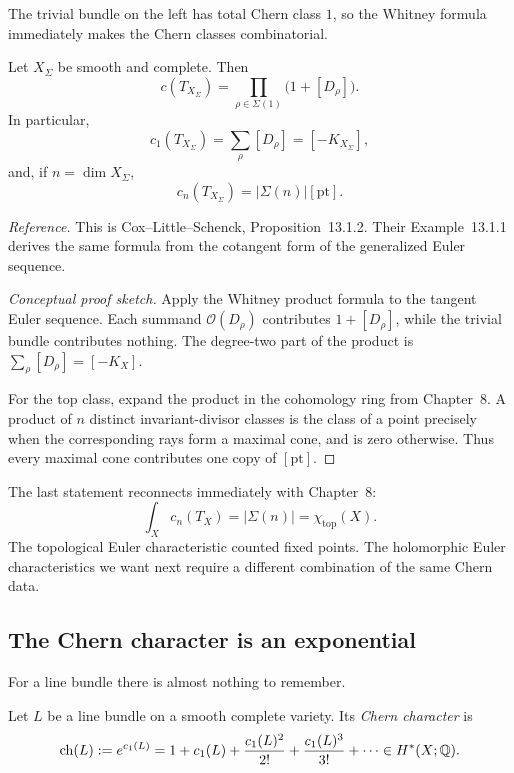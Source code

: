 The trivial bundle on the left has total Chern class \(1\), so the
Whitney formula immediately makes the Chern classes combinatorial.

\begin{proposition}
\label{prop:toric-total-chern-class}
Let \(X_\Sigma\) be smooth and complete. Then
\[
\boxed{
c(T_{X_\Sigma})
=
\prod_{\rho\in\Sigma(1)}\bigl(1+[D_\rho]\bigr).
}
\]
In particular,
\[
c_1(T_{X_\Sigma})
=
\sum_\rho[D_\rho]
=
[-K_{X_\Sigma}],
\]
and, if \(n=\dim X_\Sigma\),
\[
c_n(T_{X_\Sigma})
=
|\Sigma(n)|[\mathrm{pt}].
\]
\end{proposition}

\noindent
\textit{Reference.}
This is Cox--Little--Schenck, Proposition~13.1.2. Their
Example~13.1.1 derives the same formula from the cotangent form of the
generalized Euler sequence.

\begin{proof}[Conceptual proof sketch]
Apply the Whitney product formula to the tangent Euler sequence. Each
summand \(\mathcal O(D_\rho)\) contributes \(1+[D_\rho]\), while the
trivial bundle contributes nothing. The degree-two part of the product
is \(\sum_\rho[D_\rho]=[-K_X]\).

For the top class, expand the product in the cohomology ring from
Chapter~8. A product of \(n\) distinct invariant-divisor classes is the
class of a point precisely when the corresponding rays form a maximal
cone, and is zero otherwise. Thus every maximal cone contributes one
copy of \([\mathrm{pt}]\).
\end{proof}

The last statement reconnects immediately with Chapter~8:
\[
\int_X c_n(T_X)
=
|\Sigma(n)|
=
\chi_{\mathrm{top}}(X).
\]
The topological Euler characteristic counted fixed points. The
holomorphic Euler characteristics we want next require a different
combination of the same Chern data.

\subsection{The Chern character is an exponential}

For a line bundle there is almost nothing to remember.

\begin{definition}
\label{def:chern-character-line-bundle}
Let \(L\) be a line bundle on a smooth complete variety. Its
\emph{Chern character} is
\[
\operatorname{ch}(L)
:=
e^{c_1(L)}
=
1+c_1(L)+\frac{c_1(L)^2}{2!}
+\frac{c_1(L)^3}{3!}+\cdots
\in H^*(X;\mathbb{Q}).
\]
\end{definition}

